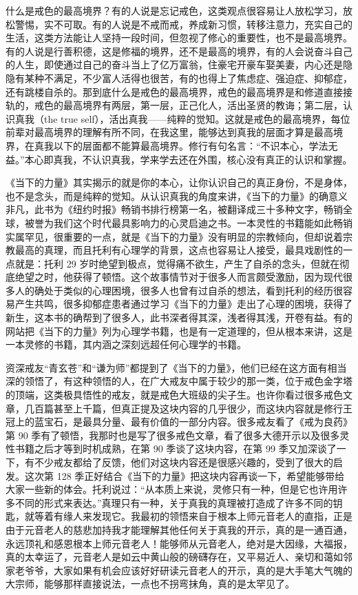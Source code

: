 什么是戒色的最高境界？有的人说是忘记戒色，这类观点很容易让人放松学习，放松警惕，实不可取。有的人说是不戒而戒，养成新习惯，转移注意力，充实自己的生活，这类方法能让人坚持一段时间，但忽视了修心的重要性，也不是最高境界。有的人说是行善积德，这是修福的境界，还不是最高的境界，有的人会说奋斗自己的人生，即使通过自己的奋斗当上了亿万富翁，住豪宅开豪车娶美妻，内心还是隐隐有某种不满足，不少富人活得也很苦，有的也得上了焦虑症、强迫症、抑郁症，还有跳楼自杀的。那到底什么是戒色的最高境界，戒色的最高境界是和修道直接接轨的，戒色的最高境界有两层，第一层，正己化人，活出圣贤的教诲；第二层，认识真我（the true self），活出真我——纯粹的觉知。这就是戒色的最高境界，每位前辈对最高境界的理解有所不同，在我这里，能够达到真我的层面才算是最高境界，在真我以下的层面都不能算最高境界。修行有句名言：“不识本心，学法无益。”本心即真我，不认识真我，学来学去还在外围，核心没有真正的认识和掌握。

《当下的力量》其实揭示的就是你的本心，让你认识自己的真正身份，不是身体，也不是念头，而是纯粹的觉知。从认识真我的角度来讲，《当下的力量》的确意义非凡，此书为《纽约时报》畅销书排行榜第一名，被翻译成三十多种文字，畅销全球，被誉为我们这个时代最具影响力的心灵启迪之书。一本灵性的书籍能如此畅销实属罕见，很重要的一点，就是《当下的力量》没有明显的宗教倾向，但却说着宗教最高的真理，而且托利有心理学的背景，这点也容易让人接受，最具戏剧性的一点就是：托利 29 岁时绝望到极点，觉得痛不欲生，产生了自杀的念头，但就在彻底绝望之时，他获得了顿悟。这个故事情节对于很多人而言颇受激励，因为现代很多人的确处于类似的心理困境，很多人也曾有过自杀的想法，看到托利的经历很容易产生共鸣，很多抑郁症患者通过学习《当下的力量》走出了心理的困境，获得了新生，这本书的确帮到了很多人，此书深者得其深，浅者得其浅，开卷有益。有的网站把《当下的力量》列为心理学书籍，也是有一定道理的，但从根本来讲，这是一本灵修的书籍，其内涵之深刻远超任何心理学的书籍。

资深戒友“青玄苍”和“谦为师”都提到了《当下的力量》，他们已经在这方面有相当深的领悟了，有这种领悟的人，在广大戒友中属于较少的那一类，位于戒色金字塔的顶端，这类极具悟性的戒友，就是戒色大班级的尖子生。也许你看过很多戒色文章，几百篇甚至上千篇，但真正提及这块内容的几乎很少，而这块内容就是修行王冠上的蓝宝石，是最具分量、最有价值的一部分内容。很多戒友看了《戒为良药》第 90 季有了顿悟，我那时也是写了很多戒色文章，看了很多大德开示以及很多灵性书籍之后才等到时机成熟，在第 90 季谈了这块内容，在第 99 季又加深谈了一下，有不少戒友都给了反馈，他们对这块内容还是很感兴趣的，受到了很大的启发。这次第 128 季正好结合《当下的力量》把这块内容再谈一下，希望能够带给大家一些新的体会。托利说过：“从本质上来说，灵修只有一种，但是它也许用许多不同的形式来表达。”真理只有一种，关于真我的真理被打造成了许多不同的钥匙，就等着有缘人来发现它。我最初的领悟来自于根本上师元音老人的直指，正是由于元音老人的慈悲加持我才能理解其他任何关于真我的开示，真的是一通百通，永远顶礼和感恩根本上师元音老人！能够师从元音老人，绝对是大因缘，大福报，真的太幸运了，元音老人是如云中黄山般的磅礴存在，又平易近人、亲切和蔼如邻家老爷爷，大家如果有机会应该好好研读元音老人的开示，真的是大手笔大气魄的大宗师，能够那样直接说法，一点也不拐弯抹角，真的是太罕见了。

